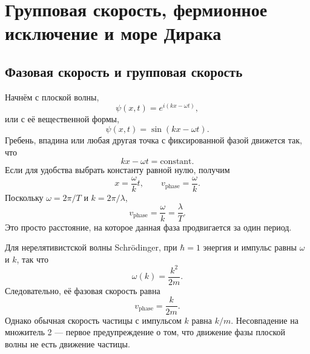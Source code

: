 \chapter{Групповая скорость, фермионное исключение и море Дирака}

\section{Фазовая скорость и групповая скорость}

\begin{classroomqa}
\end{classroomqa}

Начнём с плоской волны,
\begin{equation}
\psi(x,t)=e^{i(kx-\omega t)},
\end{equation}
или с её вещественной формы,
\begin{equation}
\psi(x,t)=\sin(kx-\omega t).
\end{equation}
Гребень, впадина или любая другая точка с фиксированной фазой движется так, что
\begin{equation}
kx-\omega t=\text{constant}.
\end{equation}
Если для удобства выбрать константу равной нулю, получим
\begin{equation}
x=\frac{\omega}{k}t,
\qquad
v_{\mathrm{phase}}=\frac{\omega}{k}.
\end{equation}
Поскольку \(\omega=2\pi/T\) и \(k=2\pi/\lambda\),
\begin{equation}
v_{\mathrm{phase}}=\frac{\omega}{k}=\frac{\lambda}{T}.
\end{equation}
Это просто расстояние, на которое данная фаза продвигается за один период.

Для нерелятивистской волны Schr\"odinger, при \(\hbar=1\) энергия и импульс равны \(\omega\) и \(k\), так что
\begin{equation}
\omega(k)=\frac{k^2}{2m}.
\end{equation}
Следовательно, её фазовая скорость равна
\begin{equation}
v_{\mathrm{phase}}=\frac{k}{2m}.
\end{equation}
Однако обычная скорость частицы с импульсом \(k\) равна \(k/m\). Несовпадение на множитель 2 — первое предупреждение о том, что движение фазы плоской волны не есть движение частицы.

